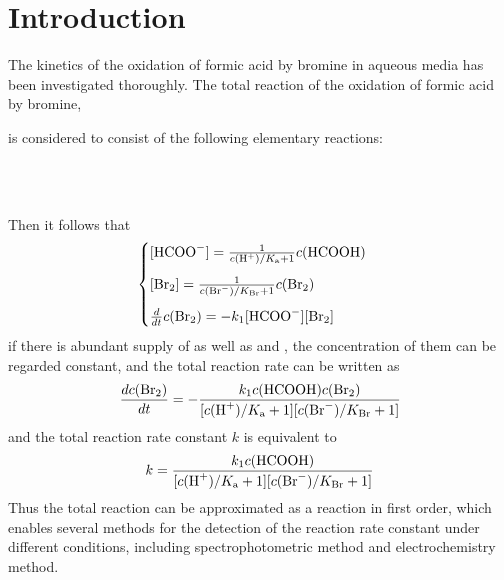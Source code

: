 \documentclass[%
preprint,
 amsmath,amssymb,
 aps,
10.5pt,
]{revtex4-1}
\begin{document}
\maketitle

\tableofcontents

\section{Introduction}
The kinetics of the oxidation of formic acid by bromine in aqueous media has been investigated thoroughly\cite{herbine1980oxidation,brusa1980kinetics}. The total reaction of the oxidation of formic acid by bromine,
\begin{center}
\end{center}
is considered to consist of the following elementary reactions:
\begin{center}
 \\
 \\
\end{center}
Then it follows that
\begin{equation}
	\begin{cases}
	[\ce{HCOO-}] = \frac{1}{c(\ce{H+})/K_\text{a}+1} c(\ce{HCOOH}) \\[0.3cm]
	[\ce{Br2}] = \frac{1}{c(\ce{Br-})/K_\text{\ce{Br}}+1} c(\ce{Br2})\\[0.3cm]
	\frac{d}{dt} c(\ce{Br2}) = - k_1 [\ce{HCOO-}] [\ce{Br2}] 
	\end{cases}
\end{equation}
if there is abundant supply of  as well as  and , the concentration of them can be regarded constant, and the total reaction rate can be written as
\begin{equation}
	\frac{d c(\ce{Br2})}{dt} = -\frac{k_1c(\ce{HCOOH})c(\ce{Br2})}{[c(\ce{H+})/K_\text{a}+1][c(\ce{Br-})/K_\text{\ce{Br}}+1]}
\end{equation}
and the total reaction rate constant $k$ is equivalent to
\begin{equation}
	k=\frac{k_1c(\ce{HCOOH})}{[c(\ce{H+})/K_\text{a}+1][c(\ce{Br-})/K_\text{\ce{Br}}+1]}
\end{equation}
Thus the total reaction can be approximated as a reaction in first order, which enables several methods for the detection of the reaction rate constant under different conditions, including spectrophotometric method and electrochemistry method.
\end{document}
